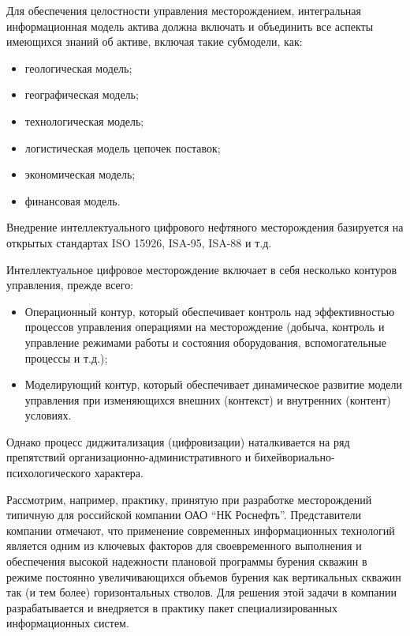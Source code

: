 Для обеспечения целостности управления месторождением, интегральная информационная модель актива должна включать и объединить все аспекты имеющихся знаний об активе, включая такие субмодели, как:  

\begin{itemize} 
	\tightlist 
	\item геологическая модель; 
	\item географическая модель;
	\item технологическая модель;
	\item логистическая модель цепочек поставок;
	\item экономическая модель; 
	\item финансовая модель.
\end{itemize} 

Внедрение интеллектуального цифрового нефтяного месторождения базируется на открытых стандартах ISO 15926, ISA-95, ISA-88 и т.д.

Интеллектуальное цифровое месторождение включает в себя несколько контуров управления, прежде всего:  
\begin{itemize} 
	\tightlist 
	\item Операционный контур, который обеспечивает контроль над эффективностью процессов управления операциями на месторождение (добыча, контроль и управление режимами работы и состояния оборудования, вспомогательные процессы и т.д.); 
	\item Моделирующий контур, который обеспечивает динамическое развитие модели управления при изменяющихся внешних (контекст) и внутренних (контент) условиях.
\end{itemize}  

Однако процесс диджитализация (цифровизации) наталкивается на ряд препятствий организационно-административного и бихейвориально-психологического характера.

Рассмотрим, например, практику, принятую при разработке месторождений типичную для российской компании ОАО ``НК Роснефть''.
Представители компании отмечают, что применение современных информационных технологий является одним из ключевых факторов для своевременного выполнения и обеспечения высокой надежности плановой программы бурения скважин в режиме постоянно увеличивающихся объемов бурения как вертикальных скважин так (и тем более) горизонтальных стволов.
Для решения этой задачи в компании разрабатывается и внедряется в практику пакет специализированных информационных систем.

